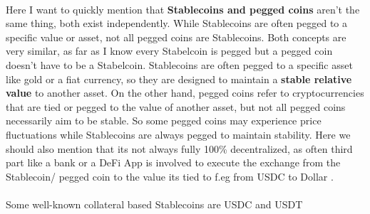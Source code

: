 \documentclass{article}
\begin{document}
\\
Here I want to quickly mention that \textbf{Stablecoins and pegged coins} aren't the same thing, both exist independently. While Stablecoins are often pegged to a specific value or asset, not all pegged coins are Stablecoins. Both concepts are very similar, as far as I know every Stabelcoin is pegged but a pegged coin doesn't have to be a Stabelcoin. Stablecoins are often pegged to a specific asset like gold or a fiat currency, so they are designed to maintain a \textbf{stable relative value} to another asset. On the other hand, pegged coins refer to cryptocurrencies that are tied or pegged to the value of another asset, but not all pegged coins necessarily aim to be stable. So some pegged coins may experience price fluctuations while Stablecoins are always pegged to maintain stability. Here we should also mention that its not always fully 100\% decentralized, as often  third part like a bank or a DeFi App is involved to execute the exchange from the Stablecoin/ pegged coin to the value its tied to f.eg from USDC to Dollar .\\
\\
Some well-known collateral based Stablecoins are USDC and USDT%
\end{document}
